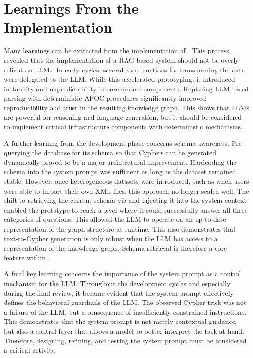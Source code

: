 \section{Learnings From the Implementation}
\label{sub:implementation}
Many learnings can be extracted from the implementation of \prototype{}. This process revealed that the implementation of a RAG-based system should not be overly reliant on LLMs. In early cycles, several core functions for transforming the data were delegated to the LLM. While this accelerated prototyping, it introduced instability and unpredictability in core system components. Replacing LLM-based parsing with deterministic APOC procedures significantly improved reproducibility and trust in the resulting knowledge graph. This shows that LLMs are powerful for reasoning and language generation, but it should be considered to implement critical infrastructure components with deterministic mechanisms.

A further learning from the development phase concerns schema awareness. Pre-querying the database for its schema so that Cyphers can be generated dynamically proved to be a major architectural improvement. Hardcoding the schema into the system prompt was sufficient as long as the dataset remained stable. However, once heterogeneous datasets were introduced, such as when users were able to import their own XML files, this approach no longer scaled well. The shift to retrieving the current schema via  and injecting it into the system context enabled the prototype to reach a level where it could successfully answer all three categories of questions. This allowed the LLM to operate on an up-to-date representation of the graph structure at runtime. This also demonstrates that text-to-Cypher generation is only robust when the LLM has access to a representation of the knowledge graph. Schema retrieval is therefore a core feature within \prototype{}.

A final key learning concerns the importance of the system prompt as a control mechanism for the LLM. Throughout the development cycles and especially during the final review, it became evident that the system prompt effectively defines the behavioral guardrails of the LLM. The observed Cypher trick was not a failure of the LLM, but a consequence of insufficiently constrained instructions. This demonstrates that the system prompt is not merely contextual guidance, but also a control layer that allows a model to better interpret the task at hand. Therefore, designing, refining, and testing the system prompt must be considered a critical activity.

